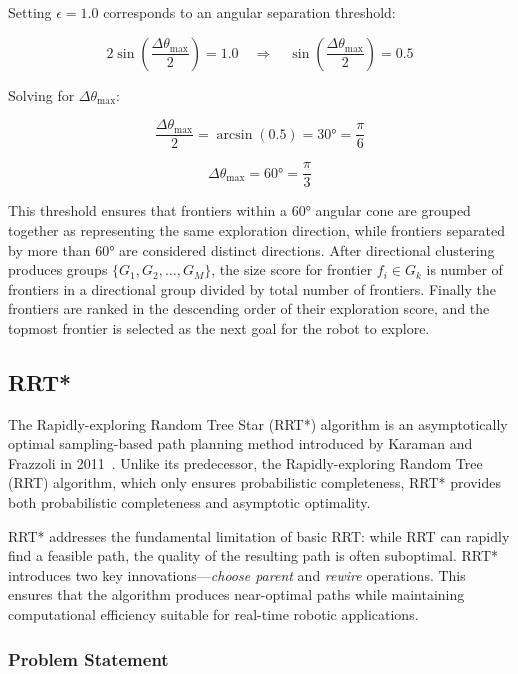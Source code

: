 \documentclass[11pt]{article}
\begin{document}
Setting $\epsilon = 1.0$ corresponds to an angular separation threshold:

\begin{equation}
	2\sin\left(\frac{\Delta\theta_{\max}}{2}\right) = 1.0 \quad \Rightarrow \quad \sin\left(\frac{\Delta\theta_{\max}}{2}\right) = 0.5
\end{equation}

Solving for $\Delta\theta_{\max}$:

\begin{equation}
	\frac{\Delta\theta_{\max}}{2} = \arcsin(0.5) = 30° = \frac{\pi}{6}
\end{equation}

\begin{equation}
	\Delta\theta_{\max} = 60° = \frac{\pi}{3}
\end{equation}


This threshold ensures that frontiers within a 60° angular cone are grouped together as representing the same exploration direction, while frontiers separated by more than 60° are considered distinct directions. After directional clustering produces groups $\{G_1, G_2, \ldots, G_M\}$, the size score for frontier $f_i \in G_k$ is number of frontiers in a directional group divided by total number of frontiers. Finally the frontiers are ranked in the descending order of their exploration score, and the topmost frontier is selected as the next goal for the robot to explore.


\subsection{RRT*}

The Rapidly-exploring Random Tree Star (RRT*) algorithm is an asymptotically optimal sampling-based path planning method introduced by Karaman and Frazzoli in 2011~\cite{karaman2011sampling}. Unlike its predecessor, the Rapidly-exploring Random Tree (RRT) algorithm, which only ensures probabilistic completeness, RRT* provides both probabilistic completeness and asymptotic optimality.

RRT* addresses the fundamental limitation of basic RRT: while RRT can rapidly find a feasible path, the quality of the resulting path is often suboptimal. RRT* introduces two key innovations---\emph{choose parent} and \emph{rewire} operations. This ensures that the algorithm produces near-optimal paths while maintaining computational efficiency suitable for real-time robotic applications.

\subsubsection{Problem Statement}
\end{document}
